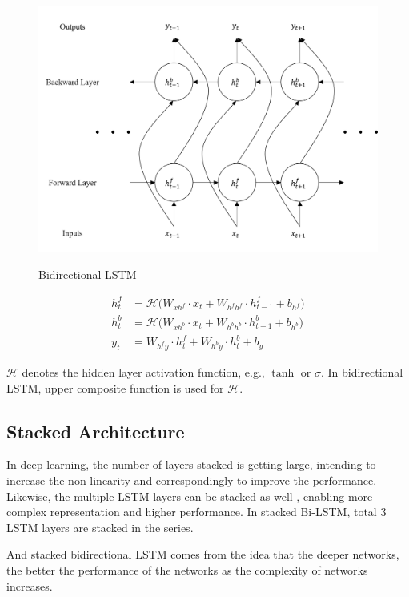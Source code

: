 \documentclass{ieeeaccess}
\begin{document}
\begin{figure}[h!]
	\centering
	\includegraphics[width=.9\linewidth]{bidirectional}
	\label{fig:bidirectional} 	
	\caption{Bidirectional LSTM}
\end{figure}
\begin{align}
h^{f}_{t} & =\mathcal{H}\big(W_{xh^{f}}\cdot x_{t}+W_{h^{f}h^{f}}\cdot h^{f}_{t-1}+b_{h^{f}}\big)\\
h^{b}_{t} & =\mathcal{H}\big(W_{xh^{b}}\cdot x_{t}+W_{h^{b}h^{b}}\cdot h^{b}_{t-1}+b_{h^{b}}\big)\\
y_{t} & =W_{h^{f}y}\cdot h^{f}_{t}+W_{h^{b}y}\cdot h^{b}_{t}+b_{y}
\end{align}

$\mathcal{H}$ denotes the hidden layer activation function, e.g., $\tanh$ or $\sigma$. In bidirectional LSTM, upper composite function is used for $\mathcal{H}$.


\subsection{Stacked Architecture}

In deep learning, the number of layers stacked is getting large, intending to increase the non-linearity and correspondingly to improve the performance. Likewise, the multiple LSTM layers can be stacked as well \cite{dyer2015transition}, enabling more complex representation and higher performance. In stacked Bi-LSTM, total 3 LSTM layers are stacked in the series. 


And stacked bidirectional LSTM comes from the idea that the deeper networks, the better the performance of the networks as the complexity of networks increases. 
\end{document}
